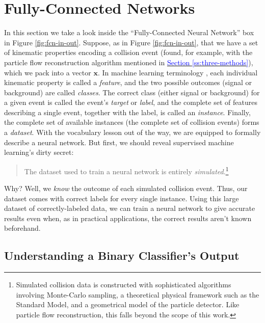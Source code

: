 \documentclass[11pt, a4paper]{article}
\newcommand{\myhref}[2]{\hyperref[#1]{\textcolor{blue}{#2}}}
\renewcommand{\vec}[1]{\bm{#1}}
\begin{document}
\section{Fully-Connected Networks} \label{s:fcn}
In this section we take a look inside the ``Fully-Connected Neural Network'' box in Figure \ref{fig:fcn-in-out}.
Suppose, as in Figure \ref{fig:fcn-in-out}, that we have a set of kinematic properties encoding a collision event (found, for example, with the particle flow reconstruction algorithm mentioned in \myhref{ss:three-methods}{Section \ref{ss:three-methods}}), which we pack into a vector $ \vec{x} $.
In machine learning terminology \cite{homl}, each individual kinematic property is called a \textit{feature}, and the two possible outcomes (signal or background) are called \textit{classes}.
The correct class (either signal or background) for a given event is called the event's \textit{target} or \textit{label}, and the complete set of features describing a single event, together with the label, is called an \textit{instance}.
Finally, the complete set of available instances (the complete set of collision events) forms a \textit{dataset}.
With the vocabulary lesson out of the way, we are equipped to formally describe a neural network.
But first, we should reveal supervised machine learning's dirty secret:
\begin{quote}
    The dataset used to train a neural network is entirely \textit{simulated}.\footnote{Simulated collision data is constructed with sophisticated algorithms involving Monte-Carlo sampling, a theoretical physical framework such as the Standard Model, and a geometrical model of the particle detector.
    Like particle flow reconstruction, this falls beyond the scope of this work.}
\end{quote}
Why? Well, we \textit{know} the outcome of each simulated collision event.
Thus, our dataset comes with correct labels for every single instance.
Using this large dataset of correctly-labeled data, we can train a neural network to give accurate results even when, as in practical applications, the correct results aren't known beforehand.

\subsection{Understanding a Binary Classifier's Output} \label{ss:output}
\end{document}
